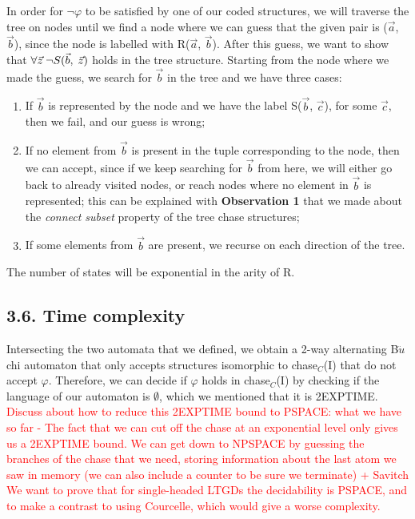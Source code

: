 \documentclass[11pt, a4paper, dvipsnames]{article}
\begin{document}
In order for $\neg \varphi$ to be satisfied by one of our coded structures, we will traverse the tree on nodes until we find a node where we can guess that the given pair is ($\vec{a}$, $\vec{b}$), since the node is labelled with R($\vec{a}$, $\vec{b}$). After this guess, we want to show that $\forall \vec{z} \hspace{0.25em} \neg S(\vec{b}, \hspace{0.25em} \vec{z})$ holds in the tree structure. Starting from the node where we made the guess, we search for $\vec{b}$ in the tree and we have three cases:
\begin{enumerate}
	\item If $\vec{b}$ is represented by the node and we have the label S($\vec{b}$, $\vec{c}$), for some $\vec{c}$, then we fail, and our guess is wrong;
	\item If no element from $\vec{b}$ is present in the tuple corresponding to the node, then we can accept, since if we keep searching for $\vec{b}$  from here, we will either go back to already visited nodes, or reach nodes where no element in $\vec{b}$ is represented; this can be explained with \textbf{Observation 1} that we made about the \textit{connect subset} property of the tree chase structures;
	\item If some elements from $\vec{b}$ are present, we recurse on each direction of the tree.
\end{enumerate}
The number of states will be exponential in the arity of R.

\subsection{3.6. Time complexity}
Intersecting the two automata that we defined, we obtain a 2-way alternating B$\ddot{u}$chi automaton that only accepts structures isomorphic to chase$_{C}$(I) that do not accept $\varphi$. Therefore, we can decide if $\varphi$ holds in chase$_{C}$(I) by checking if the language of our automaton is $\emptyset$, which we mentioned that it is 2EXPTIME.\newline
\textcolor{red}{Discuss about how to reduce this 2EXPTIME bound to PSPACE: what we have so far - The fact that we can cut off the chase at an exponential level only
gives us a 2EXPTIME bound. We can get down to NPSPACE by guessing
the branches of the chase that we need, storing information about
the last atom we saw in memory (we can also include a counter to
be sure we terminate) + Savitch} \newline
\textcolor{red}{We want to prove that for single-headed LTGDs the decidability is PSPACE, and to make a contrast to using Courcelle, which would give a worse complexity.}
\end{document}
